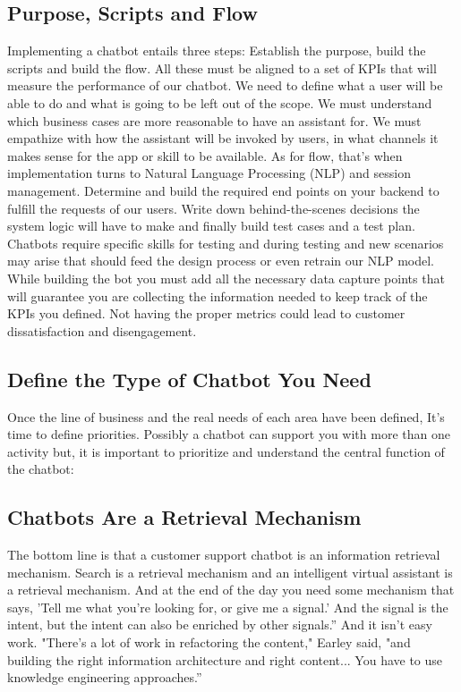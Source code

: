 \documentclass[9pt,software]{livecoms}
\begin{document}
\subsection{Purpose, Scripts and Flow}
Implementing a chatbot entails three steps: Establish the purpose, build the scripts and build the flow. All these must be aligned to a set of KPIs that will measure the performance of our chatbot. We need to define what a user will be able to do and what is going to be left out of the scope. We must understand which business cases are more reasonable to have an assistant for. We must empathize with how the assistant will be invoked by users, in what channels it makes sense for the app or skill to be available. As for flow, that’s when implementation turns to Natural Language Processing (NLP) and session management. Determine and build the required end points on your backend to fulfill the requests of our users. Write down behind-the-scenes decisions the system logic will have to make and finally build test cases and a test plan. Chatbots require specific skills for testing and during testing and new scenarios may arise that should feed the design process or even retrain our NLP model. While building the bot you must add all the necessary data capture points that will guarantee you are collecting the information needed to keep track of the KPIs you defined. Not having the proper metrics could lead to customer dissatisfaction and disengagement.

\subsection{Define the Type of Chatbot You Need}
Once the line of business and the real needs of each area have been defined, It’s time to define priorities. Possibly a chatbot can support you with more than one activity but, it is important to prioritize and understand the central function of the chatbot:

\subsection{Chatbots Are a Retrieval Mechanism}
The bottom line is that a customer support chatbot is an information retrieval mechanism. Search is a retrieval mechanism and an intelligent virtual assistant is a retrieval mechanism. And at the end of the day you need some mechanism that says, 'Tell me what you're looking for, or give me a signal.' And the signal is the intent, but the intent can also be enriched by other signals.”
And it isn’t easy work. "There's a lot of work in refactoring the content," Earley said, "and building the right information architecture and right content... You have to use knowledge engineering approaches.”
\end{document}

